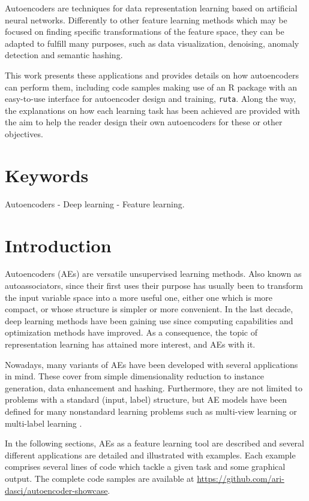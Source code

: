\documentclass[
	fontsize=11pt, %
	twoside=false, %
	open=any, %
	secnumdepth=1, %
]{kaobook}
\begin{document}
Autoencoders are techniques for data representation learning based on artificial neural networks. Differently to other feature learning methods which may be focused on finding specific transformations of the feature space, they can be adapted to fulfill many purposes, such as data visualization, denoising, anomaly detection and semantic hashing. 

This work presents these applications and provides details on how autoencoders can perform them, including code samples making use of an R package with an easy-to-use interface for autoencoder design and training, \texttt{ruta}. Along the way, the explanations on how each learning task has been achieved are provided with the aim to help the reader design their own autoencoders for these or other objectives. 

\section*{Keywords}Autoencoders - Deep learning - Feature learning.
%
%
%
\section{Introduction}

Autoencoders (AEs) \cite{hinton} are versatile unsupervised learning methods. Also known as autoassociators, since their first uses their purpose has usually been to transform the input variable space into a more useful one, either one which is more compact, or whose structure is simpler or more convenient. In the last decade, deep learning methods have been gaining use since computing capabilities and optimization methods have improved. As a consequence, the topic of representation learning \cite{bengio} has attained more interest, and AEs with it.

Nowadays, many variants of AEs \cite{charte} have been developed with several applications in mind. These cover from simple dimensionality reduction to instance generation, data enhancement and hashing. Furthermore, they are not limited to problems with a standard (input, label) structure, but AE models have been defined for many nonstandard learning problems such as multi-view learning or multi-label learning \cite{nonstandard,advcae,maniac}.

In the following sections, AEs as a feature learning tool are described and several different applications are detailed and illustrated with examples. Each example comprises several lines of code which tackle a given task and some graphical output. The complete code samples are available at \url{https://github.com/ari-dasci/autoencoder-showcase}.
\end{document}
